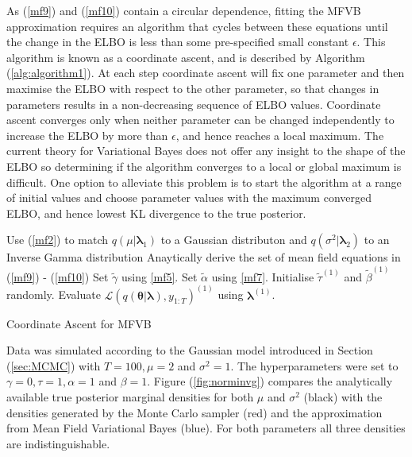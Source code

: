 \documentclass[12pt,a4paper]{article}%
\numberwithin{equation}{section}
\begin{document}
As (\ref{mf9}) and (\ref{mf10}) contain a circular dependence, fitting the MFVB approximation requires an algorithm that cycles between these equations until the change in the ELBO is less than some pre-specified small constant $\epsilon$. This algorithm is known as a coordinate ascent, and is described by Algorithm (\ref{alg:algorithm1}). At each step coordinate ascent will fix one parameter and then maximise the ELBO with respect to the other parameter, so that changes in parameters results in a non-decreasing sequence of ELBO values. Coordinate ascent converges only when neither parameter can be changed independently to increase the ELBO by more than $\epsilon$, and hence reaches a local maximum.
The current theory for Variational Bayes does not offer any insight to the shape of the ELBO so determining if the algorithm converges to a local or global maximum is difficult. One option to alleviate this problem is to start the algorithm at a range of initial values and choose parameter values with the maximum converged ELBO, and hence lowest KL divergence to the true posterior. 
\vspace{2mm}
\begin{algorithm}[H]
 Use (\ref{mf2}) to match $q(\mu|\boldsymbol{\lambda}_1)$ to a Gaussian distributon and $q(\sigma^2 | \boldsymbol{\lambda}_2)$ to an Inverse Gamma distribution\;
 Anaytically derive the set of mean field equations in (\ref{mf9}) - (\ref{mf10})\;
 Set $\tilde{\gamma}$ using \ref{mf5}.\;
 Set $\tilde{\alpha}$ using \ref{mf7}.\;
 Initialise $\tilde{\tau}^{(1)}$ and $\tilde{\beta}^{(1)}$ randomly.\;
 Evaluate $\mathcal{L}(q(\boldsymbol{\theta} | \boldsymbol{\lambda}), y_{1:T})^{(1)}$ using $\boldsymbol{\lambda}^{(1)}$.\;
 \caption{Coordinate Ascent for MFVB}
  \label{alg:algorithm1}
\end{algorithm}
\vspace{2mm}
Data was simulated according to the Gaussian model introduced in Section (\ref{sec:MCMC}) with $T = 100, \mu = 2$ and $\sigma^2 = 1$. The hyperparameters were set to $\gamma = 0, \tau = 1, \alpha = 1$ and $\beta = 1$. Figure (\ref{fig:norminvg}) compares the analytically available true posterior marginal densities for both $\mu$ and $\sigma^2$ (black) with the densities generated by the Monte Carlo sampler (red) and the approximation from Mean Field Variational Bayes (blue). For both parameters all three densities are indistinguishable.
\end{document}

